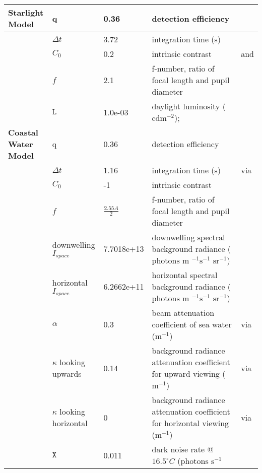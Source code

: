 \begin{tabular}{|L{3.5cm}|L{2cm}|L{2cm}|L{4.5cm}|L{4.5cm}|}
\textbf{Starlight Model}&q&0.36&detection efficiency&\cite{Nils14a}\\\hline
 &$\Delta t$&3.72&integration time (s)&\cite{Donn95a}\\\hline
 &$C_{0}$&0.2&intrinsic contrast&\cite{Hest68a} and \cite{Blac46a}\\\hline
 &$f$&2.1&f-number, ratio of focal length and pupil diameter&\cite{Mill79a}\\\hline
 &$\mathtt{L}$&1.0e-03&daylight luminosity ($\text{cd} \text{m}^{-2}$);&\cite{Midd52a}\\\hline
\textbf{Coastal Water Model}&q&0.36&detection efficiency&\cite{Nils14a}\\\hline
 &$\Delta t$&1.16&integration time (s)&\cite{Donn95a} via \cite{Nils14a}\\\hline
 &$C_{0}$&-1&intrinsic contrast&\cite{Nils14a}\\\hline
 &$f$&$\frac{2.55A}{2}$&f-number, ratio of focal length and pupil diameter&\cite{Nils14a}\\\hline
 &downwelling $I_{space}$&7.7018e+13&downwelling spectral background radiance ($\text{photons } \text{m }^{-1} \text{s}^{-1} \text{ sr}^{-1}$)&\cite{Nils14a}\\\hline
 &horizontal $I_{space}$&6.2662e+11&horizontal spectral background radiance ($\text{photons } \text{m }^{-1} \text{s}^{-1} \text{ sr}^{-1}$)&\cite{Nils14a}\\\hline
 &$\alpha$&0.3&beam attenuation coefficient of sea water ($\text{m}^{-1}$)&\cite{John02a} via \cite{Nils14a}\\\hline
 &$\kappa$ looking upwards&0.14&background radiance attenuation coefficient for upward viewing ($\text{m}^{-1}$)&\cite{John02a} via \cite{Nils14a}\\\hline
 &$\kappa$ looking horizontal&0&background radiance attenuation coefficient for horizontal viewing ($\text{m}^{-1}$)&\cite{John02a} via \cite{Nils14a}\\\hline
 &$\mathtt{X}$&0.011&dark noise rate @$16.5^{\circ} C$ ($\text{photons } \text{s}^{-1}$&\cite{Aho93a}\\\hline
\end{tabular}
